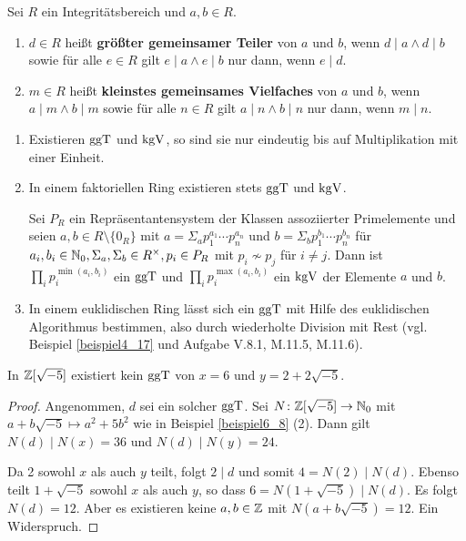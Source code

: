 \begin{definition}\label{definition6_15}
	Sei $R$ ein Integritätsbereich und $a,b \in R$.
	\begin{enumerate}[label=(\alph*)]
		\item $d \in R$ heißt \textbf{größter gemeinsamer Teiler} von $a$ und $b$, wenn $d \mid a \land d \mid b$ sowie für alle $e \in R$ gilt $e \mid a \land e \mid b$ nur dann, wenn $e \mid d$.
		\item $m \in R$ heißt  \textbf{kleinstes gemeinsames Vielfaches} von $a$ und $b$, wenn $a \mid m \land b \mid m$ sowie für alle $n \in R$ gilt $a \mid n \land b \mid n$ nur dann, wenn $m \mid n$.
	\end{enumerate}
\end{definition}
\begin{rem}\label{rem6_16}
	\begin{enumerate}[label=(\roman*)]
		\item Existieren $\mathrm{ggT}$ und $\mathrm{kgV}$, so sind sie nur eindeutig bis auf Multiplikation mit einer Einheit.
		\item In einem faktoriellen Ring existieren stets $\mathrm{ggT}$ und $\mathrm{kgV}$. 
		
		Sei $P_R$ ein Repräsentantensystem der Klassen assoziierter Primelemente und seien $a,b \in R\setminus\{0_R\}$ mit $a = \Sigma_a p_1^{a_1} \cdots p_n^{a_n}$ und $b = \Sigma_b p_1^{b_1} \cdots p_n^{b_n}$ für $a_i,b_i \in \mathbb{N}_0, \Sigma_a, \Sigma_b \in R^\times, p_i \in P_R$ mit $p_i \not\sim p_j$ für $i \neq j$. Dann ist $\prod_i p_i^{\min(a_i,b_i)}$ ein $\mathrm{ggT}$ und $\prod_i p_i^{\max(a_i,b_i)}$ ein $\mathrm{kgV}$ der Elemente $a$ und $b$.
		\item In einem euklidischen Ring lässt sich ein $\mathrm{ggT}$ mit Hilfe des euklidischen Algorithmus bestimmen, also durch wiederholte Division mit Rest (vgl. Beispiel \ref{beispiel4_17} und Aufgabe V.8.1, M.11.5, M.11.6).
	\end{enumerate}
\end{rem}
\begin{beispiel}\label{beispiel6_17}
	In $\mathbb{Z}[\sqrt{-5}]$ existiert kein $\mathrm{ggT}$ von $x = 6$ und $y = 2 + 2\sqrt{-5}$.
	\begin{proof}
	Angenommen, $d$ sei ein solcher $\mathrm{ggT}$. Sei $N \colon \mathbb{Z}[\sqrt{-5}] \to \mathbb{N}_0$ mit $a + b \sqrt{-5} \mapsto a^2 + 5b^2$ wie in Beispiel \ref{beispiel6_8} (2). Dann gilt $N(d) \mid N(x) = 36$ und $N(d) \mid N(y) = 24$.
	
	Da 2 sowohl $x$ als auch $y$ teilt, folgt $2 \mid d$ und somit $4 = N(2) \mid N(d)$. Ebenso teilt $1 + \sqrt{-5}$ sowohl $x$ als auch $y$, so dass $6 = N(1 + \sqrt{-5}) \mid N(d)$. Es folgt $N(d)= 12$. Aber es existieren keine $a,b \in \mathbb{Z}$ mit $N(a + b\sqrt{-5}) = 12$. Ein Widerspruch.
	\end{proof}
\end{beispiel}
